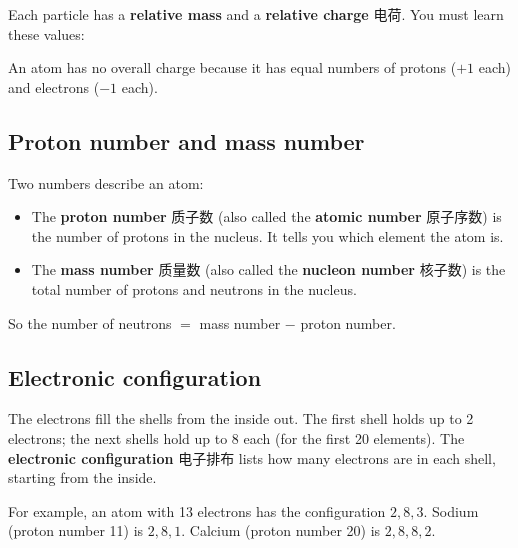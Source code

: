 \documentclass[11pt]{article}
\begin{document}
Each particle has a \textbf{relative mass} and a \textbf{relative charge} 电荷. You must learn these values:

\begin{center}
\end{center}

An atom has no overall charge because it has equal numbers of protons ($+1$ each) and electrons ($-1$ each).

\subsection*{Proton number and mass number}

Two numbers describe an atom:

\begin{itemize}
\item The \textbf{proton number} 质子数 (also called the \textbf{atomic number} 原子序数) is the number of protons in the nucleus. It tells you which element the atom is.

\item The \textbf{mass number} 质量数 (also called the \textbf{nucleon number} 核子数) is the total number of protons and neutrons in the nucleus.

\end{itemize}

So the number of neutrons $=$ mass number $-$ proton number.

\subsection*{Electronic configuration}

The electrons fill the shells from the inside out. The first shell holds up to 2 electrons; the next shells hold up to 8 each (for the first 20 elements). The \textbf{electronic configuration} 电子排布 lists how many electrons are in each shell, starting from the inside.

For example, an atom with 13 electrons has the configuration $2,8,3$. Sodium (proton number 11) is $2,8,1$. Calcium (proton number 20) is $2,8,8,2$.
\end{document}
